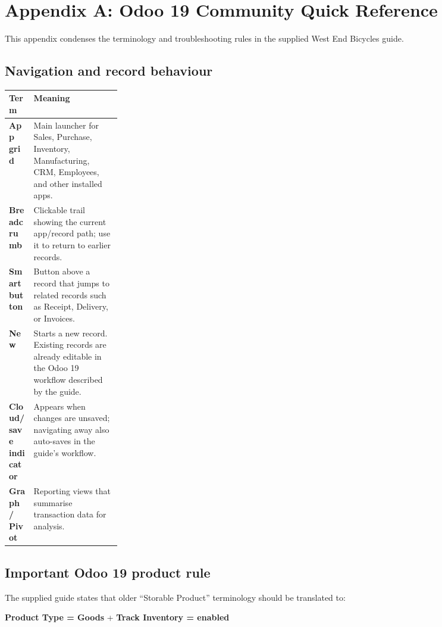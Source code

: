 \chapter*{Appendix A: Odoo 19 Community Quick Reference}

This appendix condenses the terminology and troubleshooting rules in the supplied West End Bicycles guide.

\section*{Navigation and record behaviour}

\begin{erptable}
\begin{tabularx}{\linewidth}{@{}>{\bfseries\leavevmode\color{ERPNavy}}p{0.22\linewidth}X@{}}
\toprule
\rowcolor{ERPPaleBlue!92}
Term & Meaning \\
\midrule
App grid & Main launcher for Sales, Purchase, Inventory, Manufacturing, CRM, Employees, and other installed apps. \\
Breadcrumb & Clickable trail showing the current app/record path; use it to return to earlier records. \\
Smart button & Button above a record that jumps to related records such as Receipt, Delivery, or Invoices. \\
New & Starts a new record. Existing records are already editable in the Odoo 19 workflow described by the guide. \\
Cloud/save indicator & Appears when changes are unsaved; navigating away also auto-saves in the guide's workflow. \\
Graph / Pivot & Reporting views that summarise transaction data for analysis. \\
\bottomrule
\end{tabularx}
\end{erptable}

\section*{Important Odoo 19 product rule}

The supplied guide states that older ``Storable Product'' terminology should be translated to:

\begin{center}
\textbf{Product Type = Goods} \qquad + \qquad \textbf{Track Inventory = enabled}
\end{center}

